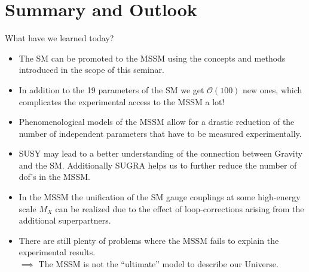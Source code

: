 \section{Summary and Outlook}
\begin{frame}{What have we learned today?}
\addtocounter{framenumber}{-1}
	\begin{itemize}
		\item The \alert{SM can be promoted to the MSSM} using the concepts and methods introduced in the scope of this seminar.\\[1em]
		\item In addition to the 19 parameters of the SM we get $\mathcal{O}(100)$  new ones, which complicates the experimental access to the MSSM a lot! \\[1em]
		\item Phenomenological models of the MSSM allow for a \alert{drastic reduction of the number of independent parameters} that have to be measured experimentally.\\[1em] 
		\item SUSY may lead to a better understanding of the \alert{connection between Gravity and the SM}. Additionally SUGRA helps us to further reduce the number of dof's in the MSSM.\\[1em] 
		\item In the MSSM the \alert{unification of the SM gauge couplings} at some high-energy scale $M_X$ can be realized due to the effect of loop-corrections arising from the additional superpartners.\\[1em] 
		\item There are still plenty of problems where the MSSM fails to explain the experimental results. \\[0.5em] $\implies$ The MSSM is not the \enquote{ultimate} model to describe our Universe.
	\end{itemize}
\end{frame}